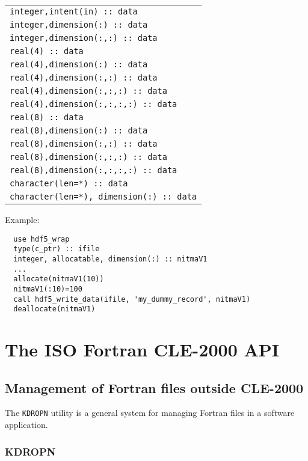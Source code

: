 \vskip 0.2cm
\begin{tabular}{|p{8.5cm}|}
\hline
{\tt integer,intent(in) :: data} \\
{\tt integer,dimension(:) :: data} \\
{\tt integer,dimension(:,:) :: data} \\
{\tt real(4) :: data} \\
{\tt real(4),dimension(:) :: data} \\
{\tt real(4),dimension(:,:) :: data} \\
{\tt real(4),dimension(:,:,:) :: data} \\
{\tt real(4),dimension(:,:,:,:) :: data} \\
{\tt real(8) :: data} \\
{\tt real(8),dimension(:) :: data} \\
{\tt real(8),dimension(:,:) :: data} \\
{\tt real(8),dimension(:,:,:) :: data} \\
{\tt real(8),dimension(:,:,:,:) :: data} \\
{\tt character(len=*) :: data} \\
{\tt character(len=*), dimension(:) :: data} \\
\hline
\end{tabular}

\vskip 0.4cm

\noindent Example:
\begin{verbatim}
  use hdf5_wrap
  type(c_ptr) :: ifile
  integer, allocatable, dimension(:) :: nitmaV1
  ...
  allocate(nitmaV1(10))
  nitmaV1(:10)=100
  call hdf5_write_data(ifile, 'my_dummy_record', nitmaV1)
  deallocate(nitmaV1)
\end{verbatim}

\clearpage

\section {The ISO Fortran CLE-2000 API}

\subsection {Management of Fortran files outside CLE-2000}

The {\tt KDROPN} utility is a general system for managing Fortran files in a software application.

\subsubsection{KDROPN}

